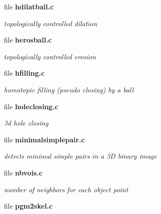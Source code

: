 \begin{DoxyCompactItemize}
\item 
file {\bf hdilatball.c}


\begin{DoxyCompactList}\small\item\em topologically controlled dilation \item\end{DoxyCompactList}

\item 
file {\bf herosball.c}


\begin{DoxyCompactList}\small\item\em topologically controlled erosion \item\end{DoxyCompactList}

\item 
file {\bf hfilling.c}


\begin{DoxyCompactList}\small\item\em homotopic filling (pseudo closing) by a ball \item\end{DoxyCompactList}

\item 
file {\bf holeclosing.c}


\begin{DoxyCompactList}\small\item\em 3d hole closing \item\end{DoxyCompactList}

\item 
file {\bf minimalsimplepair.c}


\begin{DoxyCompactList}\small\item\em detects minimal simple pairs in a 3D binary image \item\end{DoxyCompactList}

\item 
file {\bf nbvois.c}


\begin{DoxyCompactList}\small\item\em number of neighbors for each object point \item\end{DoxyCompactList}

\item 
file {\bf pgm2skel.c}



\end{DoxyCompactItemize}
